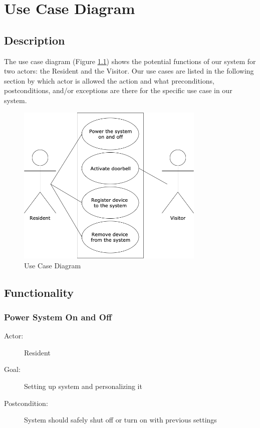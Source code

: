 \chapter{Use Case Diagram}

\section{Description}
The use case diagram (Figure \ref{fig:usecase}) shows the potential functions of our system for two actors: the Resident and the Visitor. Our use cases are listed in the following section by which actor is allowed the action and what preconditions, postconditions, and/or exceptions are there for the specific use case in our system.

\begin{figure}[h]
  \includegraphics[width=0.8\textwidth]{UseCase-updated.png}
  \centering
  \caption{Use Case Diagram}
  \label{fig:usecase}
\end{figure}

\section{Functionality}

\subsection{Power System On and Off}
\begin{description}
\item [Actor:] Resident
\item [Goal:] Setting up system and personalizing it
\item [Postcondition:] System should safely shut off or turn on with previous settings
\end{description}
